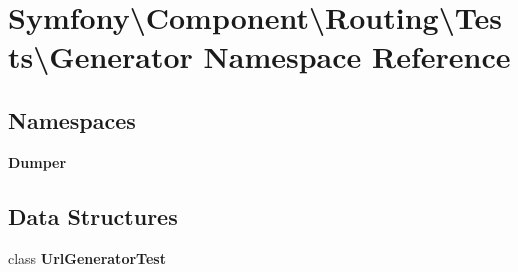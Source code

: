 \section{Symfony\textbackslash{}Component\textbackslash{}Routing\textbackslash{}Tests\textbackslash{}Generator Namespace Reference}
\label{namespace_symfony_1_1_component_1_1_routing_1_1_tests_1_1_generator}
\subsection*{Namespaces}
\begin{DoxyCompactItemize}
\item 
 {\bf Dumper}
\end{DoxyCompactItemize}
\subsection*{Data Structures}
\begin{DoxyCompactItemize}
\item 
class {\bf Url\+Generator\+Test}
\end{DoxyCompactItemize}
